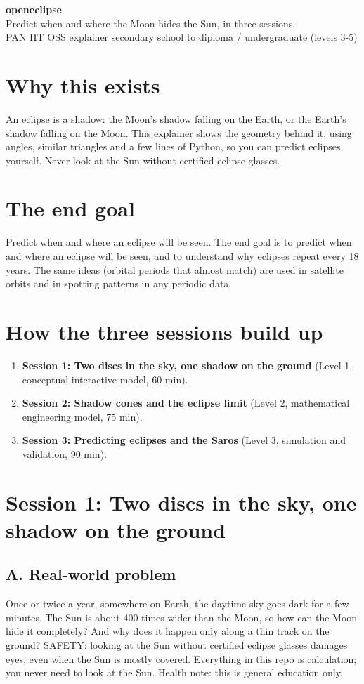 \documentclass[11pt,a4paper]{article}
\begin{document}
\begin{center}{\LARGE\bfseries openeclipse}\\[0.4em]{\large Predict when and where the Moon hides the Sun, in three sessions.}\\[0.2em]\small PAN IIT OSS explainer \textbullet{} secondary school to diploma / undergraduate (levels 3-5)\end{center}

\section*{Why this exists}
An eclipse is a shadow: the Moon's shadow falling on the Earth, or the Earth's shadow falling on the Moon. This explainer shows the geometry behind it, using angles, similar triangles and a few lines of Python, so you can predict eclipses yourself. Never look at the Sun without certified eclipse glasses.

\section*{The end goal}
Predict when and where an eclipse will be seen. The end goal is to predict when and where an eclipse will be seen, and to understand why eclipses repeat every 18 years. The same ideas (orbital periods that almost match) are used in satellite orbits and in spotting patterns in any periodic data.

\section*{How the three sessions build up}
\begin{enumerate}[nosep]
\item \textbf{Session 1: Two discs in the sky, one shadow on the ground} (Level 1, conceptual interactive model, 60 min).
\item \textbf{Session 2: Shadow cones and the eclipse limit} (Level 2, mathematical engineering model, 75 min).
\item \textbf{Session 3: Predicting eclipses and the Saros} (Level 3, simulation and validation, 90 min).
\end{enumerate}

\section{Session 1: Two discs in the sky, one shadow on the ground}

\subsection*{A. Real-world problem}
Once or twice a year, somewhere on Earth, the daytime sky goes dark for a few minutes. The Sun is about 400 times wider than the Moon, so how can the Moon hide it completely? And why does it happen only along a thin track on the ground? SAFETY: looking at the Sun without certified eclipse glasses damages eyes, even when the Sun is mostly covered. Everything in this repo is calculation; you never need to look at the Sun. Health note: this is general education only.
\end{document}
